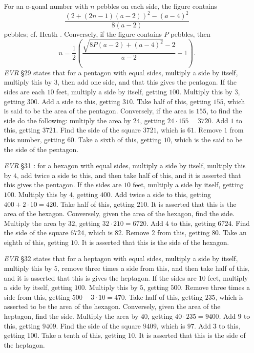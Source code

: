 \documentclass{article}
\theoremstyle{definition}
\begin{document}
For an $a$-gonal number with $n$ pebbles on each side, the figure contains 
\[
\frac{(2+(2n-1)(a-2))^2-(a-4)^2}{8(a-2)}
\]
pebbles; cf. Heath \cite[p.~516]{HGMII}.
Conversely, if the figure contains $P$ pebbles, then
\[
n=\frac{1}{2}\left( \frac{\sqrt{8P(a-2)+(a-4)^2}-2}{a-2}+1\right).
\]
{\em EVR} \S 29 \cite[pp.~164--167]{guillaumin} states that for a pentagon with equal sides, multiply a side by itself,
multiply this by $3$, then add one side, and that this gives the pentagon. If the sides are each $10$ feet, multiply
a side by itself, getting $100$. Multiply this by $3$, getting $300$. Add a side to this, getting $310$. Take
half of this, getting $155$, which is said to be the area of the pentagon. 
Conversely, if the area is $155$, to find the side do the following: multiply the area by $24$, getting
$24 \cdot 155 = 3720$. Add $1$ to this, getting $3721$. Find the side of the square $3721$, which is $61$. 
Remove $1$ from this number, getting $60$. Take a sixth of this, getting $10$, which is the said to be the side of the
pentagon.

{\em EVR} \S 31 \cite[pp.~172--177]{guillaumin}: for a hexagon with equal sides, multiply
a side by itself, multiply this by $4$, add twice a side to this, and then take half of this, and it is asserted
that this gives the pentagon. If the sides are $10$ feet, multiply a side by itself, getting $100$. 
Multiply this by $4$, getting $400$. Add twice a side to this, getting $400+2\cdot 10=420$. Take half
of this, getting $210$. It is asserted that this is the area of the hexagon. Conversely,
given the area of the hexagon, find the side. Multiply the area by $32$, getting $32 \cdot 210 = 6720$.
Add $4$ to this, getting $6724$. Find the side of the square $6724$, which is $82$. Remove $2$ from this,
getting $80$. Take an eighth of this, getting $10$. It is asserted that this is the side of the hexagon.

{\em EVR} \S 32 \cite[pp.~176--179]{guillaumin} states that for a heptagon with equal sides, multiply a side by
itself, multiply this by $5$, remove three times a side from this, and then take half of this, and it is asserted that
this is gives the heptagon. If the sides are $10$ feet,
multiply a side by itself, getting $100$. Multiply this by $5$, getting $500$. Remove three times a side from this,
getting $500-3\cdot 10=470$. Take half of this, getting $235$, which is asserted to be the area of the hexagon.
Conversely,
given the area of the heptagon, find the side. Multiply the area by $40$, getting $40 \cdot 235 = 9400$.
Add $9$ to this, getting $9409$. Find the side of the square $9409$, which is $97$. Add $3$ to this, getting $100$.
Take a tenth of this, getting $10$. It is asserted that this is the side of the heptagon.
\end{document}
